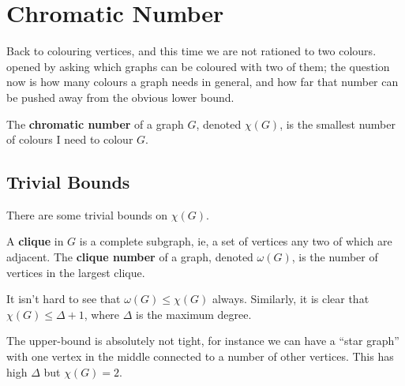 \section{Chromatic Number}

Back to colouring vertices, and this time we are not rationed to two colours.  opened by asking which graphs can be coloured with two of them; the question now is how many colours a graph needs in general, and how far that number can be pushed away from the obvious lower bound.

\begin{boxdefinition} \label{Ch2:Def:Chromatic_Number}
    The \textbf{chromatic number} of a graph $G$, denoted $\chi(G)$, is the smallest number of colours I need to colour $G$.
\end{boxdefinition}

\subsection{Trivial Bounds}

There are some trivial bounds on $\chi(G)$.

\begin{boxdefinition}[Clique]
    A \textbf{clique} in $G$ is a complete subgraph, ie, a set of vertices any two of which are adjacent. The \textbf{clique number} of a graph, denoted $\omega(G)$, is the number of vertices in the largest clique.
\end{boxdefinition}

It isn't hard to see that $\omega(G) \leq \chi(G)$ always. Similarly, it is clear that $\chi(G) \leq \Delta + 1$, where $\Delta$ is the maximum degree.

The upper-bound is absolutely not tight, for instance we can have a ``star graph'' with one vertex in the middle connected to a number of other vertices. This has high $\Delta$ but $\chi(G) = 2$.

\begin{figure}[H]
    \centering
\end{figure}

